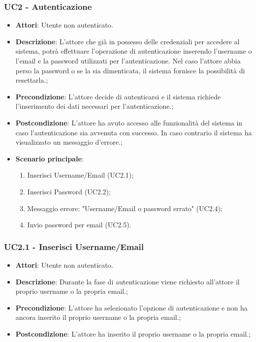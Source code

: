 \subsubsection{UC2 - Autenticazione} 
\label{sssec:UC2} 
\begin{itemize} 
\item \textbf{Attori}: Utente non autenticato.
\item \textbf{Descrizione}: L'attore che già in possesso delle credenziali per accedere al sistema, potrà effettuare l'operazione di autenticazione inserendo l'username o l'email e la password utilizzati per l'autenticazione. Nel caso l’attore abbia perso la password o se la sia dimenticata, il sistema fornisce la possibilità di resettarla.;
\item \textbf{Precondizione}: L'attore decide di autenticarsi e il sistema richiede l'inserimento dei dati necessari per l'autenticazione.;
\item \textbf{Postcondizione}: L'attore ha avuto accesso alle funzionalità del sistema in caso l'autenticazione sia avvenuta con successo. In caso contrario il sistema ha visualizzato un messaggio d'errore.;
\item \textbf{Scenario principale}: \begin{enumerate}\item Inserisci Username/Email (UC2.1);\item Inserisci Password (UC2.2);\item Messaggio errore: "Username/Email o password errato" (UC2.4);\item Invio password per email (UC2.5). 
 \end{enumerate}
\end{itemize} 
\subsubsection{UC2.1 - Inserisci Username/Email} 
\label{sssec:UC2.1} 
\begin{itemize} 
\item \textbf{Attori}: Utente non autenticato.
\item \textbf{Descrizione}: Durante la fase di autenticazione viene richiesto all'attore il proprio username o la propria email.;
\item \textbf{Precondizione}: L'attore ha selezionato l'opzione di autenticazione e non ha ancora inserito il proprio username o la propria email.;
\item \textbf{Postcondizione}: L'attore ha inserito il proprio username o la propria email.;
\end{itemize} 
